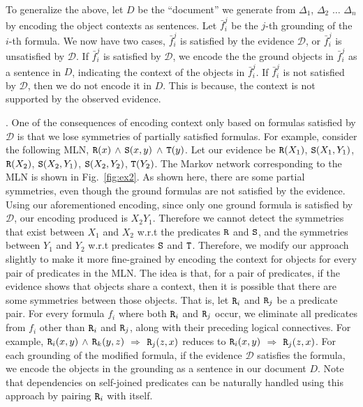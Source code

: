 To generalize the above, let $D$ be the ``document'' we generate from $\Delta_1$, $\Delta_2$ $\ldots$ $\Delta_n$  by encoding the object contexts as sentences. Let $\bar{f}_i^j$ be the $j$-th grounding of the $i$-th formula. We now have two cases, $\bar{f}_i^j$ is satisfied by the evidence $\mathcal{D}$, or $\bar{f}_i^j$  is unsatisfied by $\mathcal{D}$. If $\bar{f}_i^j$ is satisfied by $\mathcal{D}$, we encode the the ground objects in $\bar{f}_i^j$ as a sentence in  $D$, indicating the context of the objects in $\bar{f}_i^j$. If $\bar{f}_i^j$ is not satisfied by $\mathcal{D}$, then we do not encode it in $D$. This is because, the context is not supported by the observed evidence. 

. One of the consequences of encoding context only based on formulas satisfied by $\mathcal{D}$ is that we lose symmetries of partially satisfied formulas. For example, consider the following MLN, ${\tt R}(x)$ $\wedge$ ${\tt S}(x,y)$ $\wedge$ ${\tt T}(y)$. Let our evidence be ${\tt R}(X_1)$, ${\tt S}(X_1,Y_1)$, ${\tt R}(X_2)$, ${\tt S}(X_2,Y_1)$, ${\tt S}(X_2,Y_2)$, ${\tt T}(Y_2)$. The Markov network corresponding to the MLN is shown in Fig.~\ref{fig:ex2}. As shown here, there are some partial symmetries, even though the ground formulas are not satisfied by the evidence. Using our aforementioned encoding, since only one ground formula is satisfied by $\mathcal{D}$, our encoding produced is $X_2Y_1$. Therefore we cannot detect the symmetries that exist between $X_1$ and $X_2$ w.r.t the predicates ${\tt R}$ and ${\tt S}$, and the symmetries between $Y_1$ and $Y_2$ w.r.t predicates ${\tt S}$ and ${\tt T}$. Therefore, we modify our approach slightly to make it more fine-grained by encoding the context for objects for every pair of predicates in the MLN. The idea is that, for a pair of predicates, if the evidence shows that objects share a context, then it is possible that there are some symmetries between those objects. That is, let ${\tt R}_i$ and ${\tt R}_j$ be a predicate pair. For every formula $f_i$ where both ${\tt R}_i$ and ${\tt R}_j$ occur, we eliminate all predicates from $f_i$ other than ${\tt R}_i$ and ${\tt R}_j$, along with their preceding logical connectives. For example, ${\tt R}_i(x,y)$ $\wedge$ ${\tt R}_k(y,z)$ $\Rightarrow$ ${\tt R}_j(z,x)$ reduces to ${\tt R}_i(x,y)$ $\Rightarrow$ ${\tt R}_j(z,x)$. For each grounding of the modified formula, if the evidence $\mathcal{D}$ satisfies the formula, we encode the objects in the grounding as a sentence in our document $D$. Note that dependencies on self-joined predicates can be naturally handled using this approach by pairing ${\tt R}_i$ with itself.

